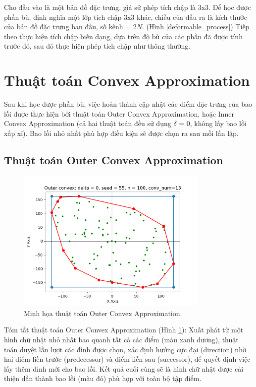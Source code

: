 \documentclass[12pt,a4paper,openany,oneside]{report}
\begin{document}
Cho đầu vào là một bản đồ đặc trưng, giả sử phép tích chập là 3x3. Để học được phần bù, định nghĩa một lớp tích chập 3x3 khác, chiều của đầu ra là kích thước của bản đồ đặc trưng ban đầu, số kênh = $2N$. (Hình \ref{deformable_process}) Tiếp theo thực hiện tích chập biến dạng, dựa trên độ bù của các phần đã được tính trước đó, sau đó thực hiện phép tích chập như thông thường.
\section{Thuật toán Convex Approximation}
Sau khi học được phần bù, việc hoàn thành cập nhật các điểm đặc trưng của bao lồi được thực hiện bởi thuật toán Outer Convex Approximation, hoặc Inner Convex Approximation (cả hai thuật toán đều sử dụng $\delta$ = 0, không lấy bao lồi xấp xỉ). Bao lồi nhỏ nhất phù hợp điều kiện sẽ được chọn ra sau mỗi lần lặp.
\subsection{Thuật toán Outer Convex Approximation}
\begin{figure}[ht!]
	\begin{center}
		\includegraphics[width=350px]{./outer_convex_approximation_brief.png}
		\caption{Minh họa thuật toán Outer Convex Approximation.}
		\label{outer_convex_approximation_brief}
	\end{center}
\end{figure} 
Tóm tắt thuật toán Outer Convex Approximation (Hình \ref{outer_convex_approximation_brief}): Xuất phát từ một hình chữ nhật nhỏ nhất bao quanh tất cả các điểm (màu xanh dương), thuật toán duyệt lần lượt các đỉnh được chọn, xác định hướng cực đại (direction) nhờ hai điểm liền trước (predecessor) và điểm liền sau (successor), để quyết định việc lấy thêm đỉnh mới cho bao lồi. Kết quả cuối cùng sẽ là hình chữ nhật được cải thiện dần thành bao lồi (màu đỏ) phù hợp với toàn bộ tập điểm. 
\end{document}
